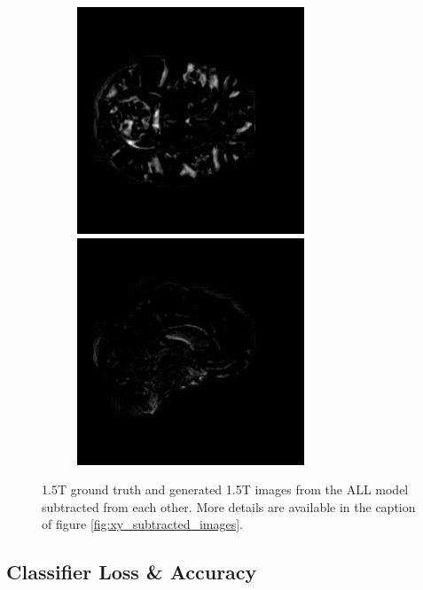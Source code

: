 \documentclass[12pt, fleqn, titlepage]{article}
\newcommand\skipperer{0.45pt}
\newcommand{\1}[1]{\mathds{1}\left[#1\right]}
\begin{document}
\begin{figure}[H]
\begin{subfigure}[b]{0.8\textwidth}
		\hskip\skipperer
		\includegraphics[width=0.22\linewidth]{imgs/subtracted_images/all/136_S_0196_xz_1.5_1.5gen_comparison}
		\hskip\skipperer
		\includegraphics[width=0.22\linewidth]{imgs/subtracted_images/all/136_S_0196_yz_1.5_1.5gen_comparison}
	\end{subfigure}
	\caption{1.5T ground truth and generated 1.5T images from the ALL model subtracted from each other. More details are available in the caption of figure \ref{fig:xy_subtracted_images}.}
	\label{fig:all_subtracted_images}
\end{figure}



\subsection{Classifier Loss \& Accuracy}\label{result_loss_cnn}
\end{document}
